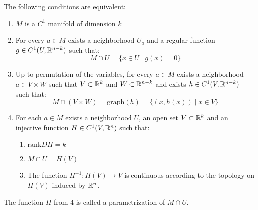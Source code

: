 \documentclass[11pt,a4paper]{article}
\begin{document}
	\begin{proposition}
		The following conditions are equivalent:
		\begin{enumerate}
			\item $M$ is a $C^1$ manifold of dimension $k$
			\item For every $a \in M$ exists a neighborhood $U_a$ and a 
			regular function $g \in C^1(U,\mathbb{R}^{n-k})$ such that:
			\[
				M \cap U = \{x \in U \mid g(x) = 0\}
			\]
			\item Up to permutation of the variables, for every $a \in M$
			exists a neighborhood $a \in V \times W$ such that 
			$V \subset \mathbb{R}^k$ and $W \subset \mathbb{R}^{n-k}$ and exists
			$h \in C^1(V, \mathbb{R}^{n-k})$ such that:
			\[
				M \cap (V \times W) = \mathrm{graph}(h) = 
				\{(x,h(x)) \mid x \in V\}
			\]
			\item For each $a \in M$ exists a neighborhood $U$, an open
			set $V \subset \mathbb{R}^k$ and an injective function $H \in C^1(V,\mathbb{R}^n)$
			such that:
			\begin{enumerate}
			\item $\mathrm{rank} DH = k$
			\item $M \cap U = H(V)$
			\item The function $H^{-1} \colon H(V) \to V$ is continuous
			according to the topology on $H(V)$ induced by $\mathbb{R}^n$.
			\end{enumerate}
		\end{enumerate}
	\end{proposition}
	\begin{remark}
		The function $H$ from 4 is called a parametrization of $M \cap U$.
	\end{remark}
	
\end{document}
